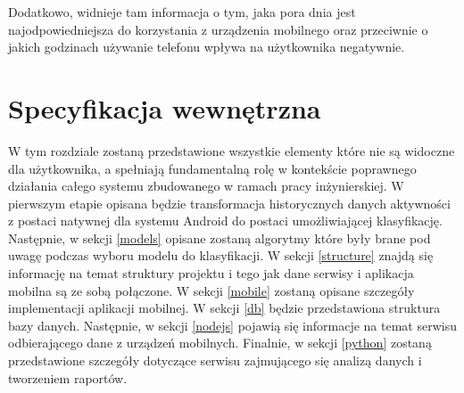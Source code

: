 \documentclass[a4paper,twoside,12pt]{book}
\begin{document}
Dodatkowo, widnieje tam informacja o tym, jaka pora dnia jest najodpowiedniejsza do korzystania z urządzenia mobilnego oraz przeciwnie o jakich godzinach używanie telefonu wpływa na użytkownika negatywnie. 



\chapter{Specyfikacja wewnętrzna}
\label{chap:wewn}
W tym rozdziale zostaną przedstawione wszystkie elementy które nie są widoczne dla użytkownika, a spełniają fundamentalną rolę w kontekście poprawnego działania całego systemu zbudowanego w ramach pracy inżynierskiej. W pierwszym etapie opisana będzie transformacja historycznych danych aktywności z postaci natywnej dla systemu Android do postaci umożliwiającej klasyfikację. Następnie, w sekcji \ref{models} opisane zostaną algorytmy które były brane pod uwagę podczas wyboru modelu do klasyfikacji. W sekcji \ref{structure} znajdą się informację na temat struktury projektu i tego jak dane serwisy i aplikacja mobilna są ze sobą połączone. W sekcji \ref{mobile} zostaną opisane szczegóły implementacji aplikacji mobilnej. W sekcji \ref{db} będzie przedstawiona struktura bazy danych. Następnie, w sekcji \ref{nodejs} pojawią się informacje na temat serwisu odbierającego dane z urządzeń mobilnych. Finalnie, w sekcji \ref{python} zostaną przedstawione szczegóły dotyczące serwisu zajmującego się analizą danych i tworzeniem raportów.   
\end{document}
